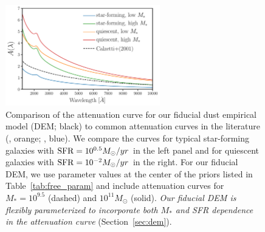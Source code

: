 \begin{figure}
\begin{center}
    \includegraphics[width=0.6\textwidth]{figs/dems.pdf}
    \caption{Comparison of the attenuation curve for our fiducial dust empirical
    model (DEM; black) to common attenuation curves in the
    literature (\citealt{calzetti2001}, orange; \citealt{salim2018}, blue). We compare the curves for typical 
    star-forming galaxies with ${\rm SFR}=10^{0.5}M_\odot/yr$ in the left panel
    and for quiescent galaxies with ${\rm SFR}=10^{-2}M_\odot/yr$ in the right.
    For our fiducial DEM, we use parameter values at {\color{red} the center of the priors
    listed in Table~\ref{tab:free_param}} and include attenuation curves for $M_* = 10^{9.5}$
    (dashed) and $10^{11} M_\odot$ (solid). {\em Our fiducial DEM is flexibly
    parameterized to incorporate both $M_*$ and SFR dependence in the
    attenuation curve} (Section~\ref{sec:dem}).
    } 
\label{fig:dem}
\end{center}
\end{figure}


